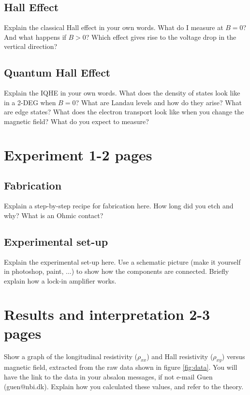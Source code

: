 \documentclass[a4paper]{article}
\begin{document}
\subsection{Hall Effect}
Explain the classical Hall effect in your own words. What do I measure at $B=0$? And what happens if $B>0$? Which effect gives rise to the voltage drop in the vertical direction?

\subsection{Quantum Hall Effect}
Explain the IQHE in your own words. What does the density of states look like in a 2-DEG when $B=0$? What are Landau levels and how do they arise? What are edge states? What does the electron transport look like when you change the magnetic field? What do you expect to measure?

\section{Experiment 1-2 pages}
\subsection{Fabrication}
Explain a step-by-step recipe for fabrication here. How long did you etch and why? What is an Ohmic contact?
\subsection{Experimental set-up}
Explain the experimental set-up here. Use a schematic picture (make it yourself in photoshop, paint, ...) to show how the components are connected. Briefly explain how a lock-in amplifier works.

\section{Results and interpretation 2-3 pages}
Show a graph of the longitudinal resistivity ($\rho_{xx}$) and Hall resistivity ($\rho_{xy}$) versus magnetic field, extracted from the raw data shown in figure \ref{fig:data}. You will have the link to the data in your absalon messages, if not e-mail Guen (guen@nbi.dk). Explain how you calculated these values, and refer to the theory.
\end{document}
